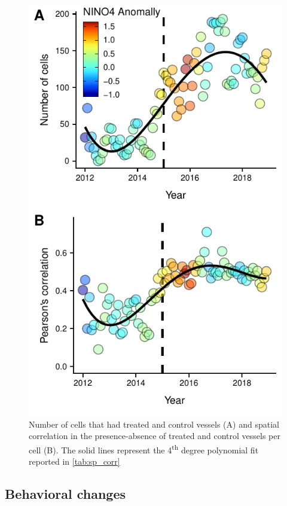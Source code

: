 \documentclass[9p,twocolumn,twoside,lineno]{pnas-new}
\begin{document}
\begin{figure}[ht]
\centering
\includegraphics{img/sp_corr.pdf}
\caption{\label{fig:sp_corr}Number of cells that had treated and control vessels (A) and spatial correlation in the presence-absence of treated and control vessels per cell (B). The solid lines represent the 4\textsuperscript{th} degree polynomial fit reported in \ref{tab:sp_corr}}
\end{figure}


\subsection{Behavioral changes}
\end{document}
